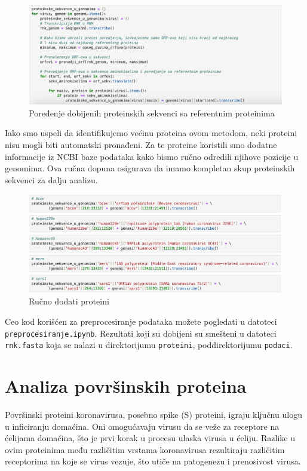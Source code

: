 \documentclass[a4paper,12pt]{article}
\begin{document}
\newpage

\begin{figure}[h!]
  \centering
  \includegraphics[width=1\textwidth]{slika5.jpeg}
  \caption{Poređenje dobijenih proteinskih sekvenci sa referentnim proteinima}
  \label{fig:my_label}
\end{figure}

\bigskip
Iako smo uspeli da identifikujemo većinu proteina ovom metodom, neki proteini nisu mogli biti automatski pronađeni. Za te proteine koristili smo dodatne informacije iz NCBI baze podataka kako bismo ručno odredili njihove pozicije u genomima. Ova ručna dopuna osigurava da imamo kompletan skup proteinskih sekvenci za dalju analizu.

\begin{figure}[h!]
  \centering
  \includegraphics[width=1\textwidth]{slika6.jpeg}
  \caption{Ručno dodati proteini}
  \label{fig:my_label}
\end{figure}

\bigskip
Ceo kod korišćen za preprocesiranje podataka možete pogledati u datoteci 
\texttt{preprocesiranje.ipynb}. Rezultati koji su dobijeni su smešteni u datoteci \texttt{rnk.fasta} koja se nalazi u direktorijumu \texttt{proteini}, poddirektorijumu \texttt{podaci}.

\newpage
\section{Analiza površinskih proteina}
Površinski proteini koronavirusa, posebno spike (S) proteini, igraju ključnu ulogu u inficiranju domaćina. Oni omogućavaju virusu da se veže za receptore na ćelijama domaćina, što je prvi korak u procesu ulaska virusa u ćeliju. Razlike u ovim proteinima među različitim vrstama koronavirusa rezultiraju različitim receptorima na koje se virus vezuje, što utiče na patogenezu i prenosivost virusa.
\end{document}
